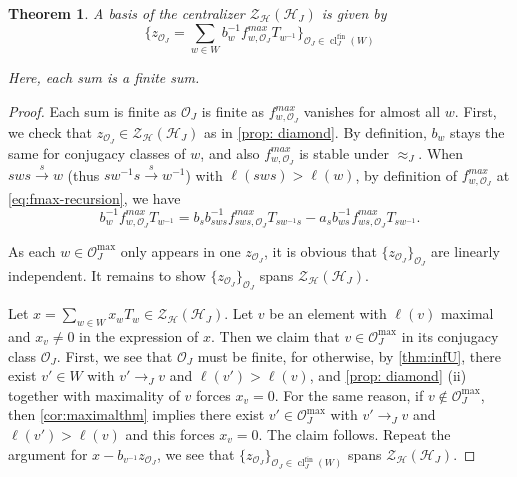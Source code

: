 \documentclass[a4paper, reqno, 14pt]{amsart}
\def\i{{^{-1}}}
\def\co{\mathcal{O}}
\DeclareMathOperator{\cl}{cl}
\DeclareMathOperator{\fin}{fin}
\newtheorem{thm}{Theorem}[section]
\theoremstyle{definition}
\theoremstyle{remark}
\numberwithin{equation}{section}
\numberwithin{thm}{section}
\begin{document}
        \begin{thm}\label{thm:mainthmcentralizer} A basis of the centralizer $\mathcal{Z}_{\mathcal{H}}(\mathcal{H}_{J})$ is given by
        $$\{z_{\mathcal{O}_J}=\sum_{w\in W} b_w^{-1} f^{max}_{w,\mathcal{O}_J} T_{w\i}\}_{\mathcal{O}_J\in \cl_J^{\fin}(W)}$$
        
        Here, each sum is a finite sum.
        \end{thm}

        \begin{proof}
            Each sum is finite as $\co_J$ is finite as $f^{max}_{w,\mathcal{O}_J}$ vanishes for almost all $w$.
            First, we check that $z_{\co_J}\in \mathcal{Z}_{\mathcal{H}}(\mathcal{H}_{J})$ as in \cref{prop: diamond}. By definition, $b_w$ stays the same for conjugacy classes of $w$, and also $f^{max}_{w,\mathcal{O}_J}$ is stable under $\approx_J$. When $sws\xrightarrow[]{s} w$ (thus $sw\i s\xrightarrow[]{s} w\i$) with $\ell(sws)>\ell(w)$, by definition of $f^{max}_{w,\mathcal{O}_J}$ at \cref{eq:fmax-recursion}, we have 
            $$b_w^{-1} f^{max}_{w,\mathcal{O}_J}T_{w\i}=b_sb_{sws}^{-1}f^{max}_{sws,\mathcal{O}_J}T_{sw\i s}-a_sb_{ws}^{-1}f^{max}_{ws,\mathcal{O}_J}T_{sw\i}.$$

            As each $w\in \co_J^{\max}$ only appears in one $z_{\co_J}$, it is obvious that $\{z_{\co_J}\}_{\co_J}$ are linearly independent. It remains to show  $\{z_{\co_J}\}_{\co_J}$ spans $\mathcal{Z}_{\mathcal{H}}(\mathcal{H}_{J})$. 

            Let $x=\sum_{w\in W}x_wT_w\in \mathcal{Z}_{\mathcal{H}}(\mathcal{H}_{J})$. Let $v$ be an element with $\ell(v)$ maximal and $x_v\neq 0$ in the expression of $x$. Then we claim that $v\in \co^{\max}_J$ in its conjugacy class $\co_J$. First, we see that $\co_J$ must be finite, for otherwise, by \cref{thm:infU}, there exist $v'\in W$ with $v'\rightarrow_{J} v$ and $\ell(v')>\ell(v)$, and \cref{prop: diamond} (ii) together with maximality of $v$ forces $x_v=0$. For the same reason, if $v\notin \co^{\max}_J$, then \cref{cor:maximalthm} implies there exist $v'\in \co^{\max}_J$ with $v'\rightarrow_{J} v$ and $\ell(v')>\ell(v)$ and this forces $x_v=0$. The claim follows. Repeat the argument for $x-b_{v\i}z_{\co_J}$, we see that $\{z_{\co_J}\}_{\co_J\in \cl^{\fin}_J(W)}$ spans $\mathcal{Z}_{\mathcal{H}}(\mathcal{H}_{J})$.
           
        \end{proof}
\end{document}
